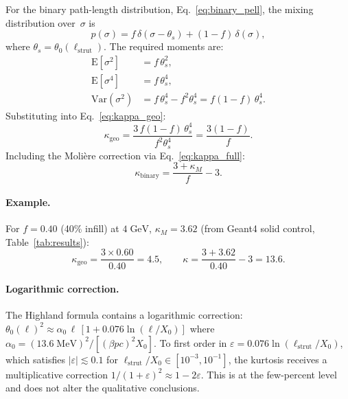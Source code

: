 \documentclass[final,5p,times,twocolumn]{elsarticle}
\begin{document}
For the binary path-length distribution, Eq.~\eqref{eq:binary_pell}, the mixing distribution over~$\sigma$ is
\begin{equation}
  p(\sigma) = f\,\delta(\sigma-\theta_s) + (1-f)\,\delta(\sigma),
  \label{eq:binary_psigma}
\end{equation}
where $\theta_s = \theta_0(\ell_{\mathrm{strut}})$.  The required moments are:
\begin{align}
  \mathrm{E}[\sigma^2] &= f\,\theta_s^2, \label{eq:bin_m2}\\
  \mathrm{E}[\sigma^4] &= f\,\theta_s^4, \label{eq:bin_m4}\\
  \mathrm{Var}(\sigma^2) &= f\,\theta_s^4 - f^2\theta_s^4 = f(1-f)\,\theta_s^4. \label{eq:bin_var}
\end{align}
Substituting into Eq.~\eqref{eq:kappa_geo}:
\begin{equation}
  \kappa_{\mathrm{geo}} = \frac{3\,f(1-f)\,\theta_s^4}{f^2\theta_s^4} = \frac{3(1-f)}{f}.
  \label{eq:kgeo_binary}
\end{equation}
Including the Moli\`{e}re correction via Eq.~\eqref{eq:kappa_full}:
\begin{equation}
  \boxed{\kappa_{\mathrm{binary}} = \frac{3+\kappa_M}{f} - 3.}
  \label{eq:kappa_binary}
\end{equation}

\paragraph{Example.}  For $f=0.40$ (40\% infill) at $4\;\text{GeV}$, $\kappa_M = 3.62$ (from Geant4 solid control, Table~\ref{tab:results}):
\begin{equation}
  \kappa_{\mathrm{geo}} = \frac{3\times 0.60}{0.40} = 4.5, \qquad
  \kappa = \frac{3+3.62}{0.40}-3 = 13.6.
  \label{eq:example}
\end{equation}

\paragraph{Logarithmic correction.}  The Highland formula contains a logarithmic correction: $\theta_0(\ell)^2 \approx \alpha_0\,\ell\,[1+0.076\ln(\ell/X_0)]$ where $\alpha_0=(13.6\;\text{MeV})^2/[(\beta pc)^2 X_0]$.  To first order in $\varepsilon = 0.076\ln(\ell_{\mathrm{strut}}/X_0)$, which satisfies $|\varepsilon|\lesssim 0.1$ for $\ell_{\mathrm{strut}}/X_0 \in [10^{-3},10^{-1}]$, the kurtosis receives a multiplicative correction $1/(1+\varepsilon)^2 \approx 1-2\varepsilon$.  This is at the few-percent level and does not alter the qualitative conclusions.
\end{document}

